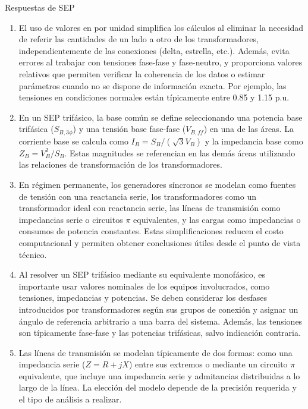 \documentclass[
  11pt,
  letterpaper,
   addpoints,
   answers
  ]{exam}
\begin{document}
\begin{questions}
\begin{solution}
        Respuestas de SEP

        \begin{enumerate}
            \item El uso de valores en por unidad simplifica los cálculos al eliminar la necesidad de referir las cantidades de un lado a otro de los transformadores, independientemente de las conexiones (delta, estrella, etc.). Además, evita errores al trabajar con tensiones fase-fase y fase-neutro, y proporciona valores relativos que permiten verificar la coherencia de los datos o estimar parámetros cuando no se dispone de información exacta. Por ejemplo, las tensiones en condiciones normales están típicamente entre 0.85 y 1.15 p.u.
        
            \item En un SEP trifásico, la base común se define seleccionando una potencia base trifásica (\(S_{B,3\phi}\)) y una tensión base fase-fase (\(V_{B,ff}\)) en una de las áreas. La corriente base se calcula como \(I_B = S_B / (\sqrt{3} V_B)\) y la impedancia base como \(Z_B = V_B^2 / S_B\). Estas magnitudes se referencian en las demás áreas utilizando las relaciones de transformación de los transformadores.
        
            \item En régimen permanente, los generadores síncronos se modelan como fuentes de tensión con una reactancia serie, los transformadores como un transformador ideal con reactancia serie, las líneas de transmisión como impedancias serie o circuitos $\pi$ equivalentes, y las cargas como impedancias o consumos de potencia constantes. Estas simplificaciones reducen el costo computacional y permiten obtener conclusiones útiles desde el punto de vista técnico.
        
            \item Al resolver un SEP trifásico mediante su equivalente monofásico, es importante usar valores nominales de los equipos involucrados, como tensiones, impedancias y potencias. Se deben considerar los desfases introducidos por transformadores según sus grupos de conexión y asignar un ángulo de referencia arbitrario a una barra del sistema. Además, las tensiones son típicamente fase-fase y las potencias trifásicas, salvo indicación contraria.
        
            \item Las líneas de transmisión se modelan típicamente de dos formas: como una impedancia serie (\(Z = R + jX\)) entre sus extremos o mediante un circuito $\pi$ equivalente, que incluye una impedancia serie y admitancias distribuidas a lo largo de la línea. La elección del modelo depende de la precisión requerida y el tipo de análisis a realizar.
        \end{enumerate}


\end{solution}
\end{questions}
\end{document}
